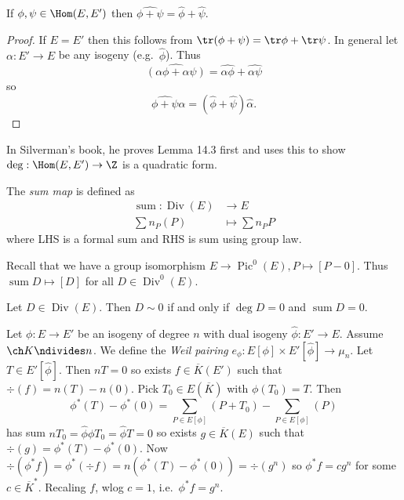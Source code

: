 \documentclass[a4paper]{article}
\theoremstyle{definition}
\theoremstyle{theorem}
\DeclareMathOperator{\Div}{Div} %
\DeclareMathOperator{\Pic}{Pic} %
\DeclareMathOperator{\Sum}{sum} %
\begin{document}
\begin{lemma}
  If \(\phi, \psi \in \Hom(E, E')\) then \(\widehat{\phi + \psi} = \hat \phi + \hat \psi\).
\end{lemma}

\begin{proof}
  If \(E = E'\) then this follows from \(\tr(\phi + \psi) = \tr \phi + \tr \psi\). In general let \(\alpha: E' \to E\) be any isogeny (e.g.\ \(\hat \phi\)). Thus
  \[
    \widehat{(\alpha \phi + \alpha \psi)} = \widehat{\alpha \phi} + \hat{\alpha \psi}
  \]
  so
  \[
    \widehat{\phi + \psi} \hat \alpha = (\hat \phi + \hat \psi) \hat \alpha.
  \]
\end{proof}

\begin{remark}
  In Silverman's book, he proves Lemma 14.3 first and uses this to show \(\deg: \Hom(E, E') \to \Z\) is a quadratic form.
\end{remark}

\begin{definition}[sum]
  The \emph{sum map} is defined as
  \begin{align*}
    \Sum: \Div(E) &\to E \\
    \sum n_P(P) &\mapsto \sum n_P P
  \end{align*}
  where LHS is a formal sum and RHS is sum using group law.
\end{definition}

Recall that we have a group isomorphism \(E \to \Pic^0(E), P \mapsto [P - 0]\). Thus \(\Sum D \mapsto [D]\) for all \(D \in \Div^0(E)\).

\begin{lemma}
  Let \(D \in \Div(E)\). Then \(D \sim 0\) if and only if \(\deg D = 0\) and \(\Sum D = 0\).
\end{lemma}

Let \(\phi: E \to E'\) be an isogeny of degree \(n\) with dual isogeny \(\hat \phi: E' \to E\). Assume \(\ch K \ndivides n\). We define the \emph{Weil pairing} \(e_\phi: E[\phi] \times E'[\hat \phi] \to \mu_n\). Let \(T \in E'[\hat \phi]\). Then \(nT = 0\) so exists \(f \in \overline K(E')\) such that \(\div(f) = n(T) - n(0)\). Pick \(T_0 \in E(\overline K)\) with \(\phi(T_0) = T\). Then
\[
  \phi^*(T) - \phi^*(0) = \sum_{P \in E[\phi]} (P + T_0) - \sum_{P \in E[\phi]}(P)
\]
has sum \(nT_0 = \hat \phi \phi T_0 = \hat \phi T = 0\) so exists \(g \in \overline K(E)\) such that \(\div(g) = \phi^*(T) - \phi^*(0)\). Now \(\div(\phi^*f) = \phi^*(\div f) = n(\phi^*(T) - \phi^*(0)) = \div (g^n)\) so \(\phi^* f = c g^n\) for some \(c \in \overline K^*\). Recaling \(f\), wlog \(c = 1\), i.e.\ \(\phi^*f = g^n\).
\end{document}
